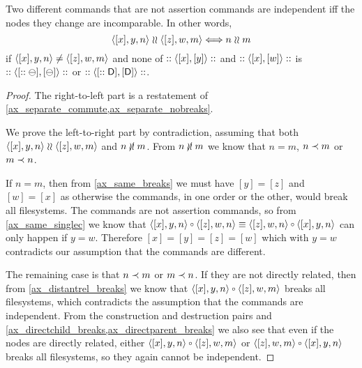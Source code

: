 \begin{mylem}
Two different commands that are not assertion commands are independent 
iff the nodes they change are incomparable. In other words,
\[ \langle{[x],y,n}\rangle\mathrel{\wr\wr}\langle{[z],w,m}\rangle \Longleftrightarrow n\mathrel{\wr\wr} m \]
if $\langle{[x],y,n}\rangle\neq\langle{[z],w,m}\rangle$ and none of $::\langle{[x],[y]}\rangle::$ and $::\langle{[x],[w]}\rangle::$ is $::\langle{[::\ominus],[\ominus]}\rangle::$ or $::\langle{[::\mathsf{D}],[\mathsf{D}]}\rangle::$.
\end{mylem}
\begin{proof}
The right-to-left part is a restatement of
\cref{ax_separate_commute,ax_separate_nobreaks}.

We prove the left-to-right part by contradiction,
assuming that both $\langle{[x],y,n}\rangle\mathrel{\wr\wr}\langle{[z],w,m}\rangle$ and $n\nunrel m$.
From $n\nunrel m$
we know that $n=m$, $n\prec m$ or $m\prec n$.

If $n=m$, then from \cref{ax_same_breaks} we must have $[y]=[z]$ and $[w]=[x]$
as otherwise the commands, in one order or the other, would break all filesystems.
The commands are not assertion commands, so from \cref{ax_same_singlec}
we know that $\cxynv\cc\czwnv\equiv\czwnv\cc\cxynv$ can only happen if $y=w$.
Therefore $[x]=[y]=[z]=[w]$ which with $y=w$ contradicts our assumption that the commands are different.

The remaining case is that $n\prec m$ or $m\prec n$.
If they are not directly related,
then from \cref{ax_distantrel_breaks} we know that
$\cxynv\cc\czwmv$ breaks all filesystems,
which contradicts the assumption that the commands are independent.
From the construction and destruction pairs and 
\cref{ax_directchild_breaks,ax_directparent_breaks} we also see that
even if the nodes are directly related, either
$\cxynv\cc\czwmv$ or $\czwmv\cc\cxynv$ 
breaks all filesystems, so they again cannot be independent.
\end{proof}

